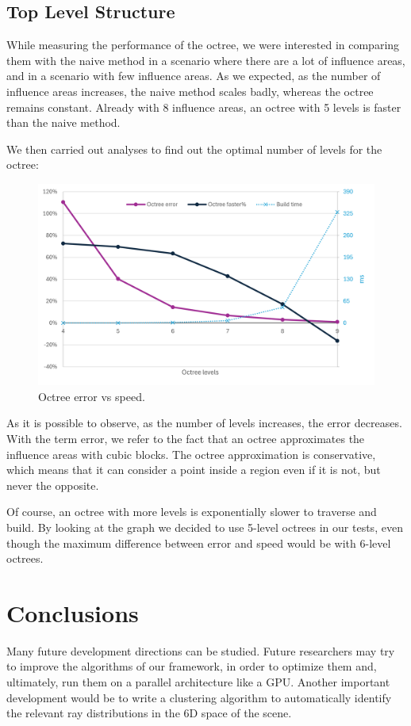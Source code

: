 \documentclass[11pt,a4paper,twocolumn]{article}
\begin{document}
\subsection{Top Level Structure}
While measuring the performance of the octree, we were interested in comparing them with the naive method in a scenario where there are a lot of influence areas, and in a scenario with few influence areas. As we expected, as the number of influence areas increases, the naive method scales badly, whereas the octree remains constant. Already with 8 influence areas, an octree with 5 levels is faster than the naive method.

We then carried out analyses to find out the optimal number of levels for the octree:

\begin{figure}[H]
    \centering
    \includegraphics[width=\textwidth*\real{0.48}]{Images/octree_error_faster_chart.png}
    \caption{Octree error vs speed.}
    \label{fig:octree_levels}
\end{figure}

As it is possible to observe, as the number of levels increases, the error decreases. With the term error, we refer to the fact that an octree approximates the influence areas with cubic blocks. The octree approximation is conservative, which means that it can consider a point inside a region even if it is not, but never the opposite.

Of course, an octree with more levels is exponentially slower to traverse and build. By looking at the graph we decided to use 5-level octrees in our tests, even though the maximum difference between error and speed would be with 6-level octrees.

\section{Conclusions}
Many future development directions can be studied. Future researchers may try to improve the algorithms of our framework, in order to optimize them and, ultimately, run them on a parallel architecture like a GPU. Another important development would be to write a clustering algorithm to automatically identify the relevant ray distributions in the 6D space of the scene.
\end{document}
